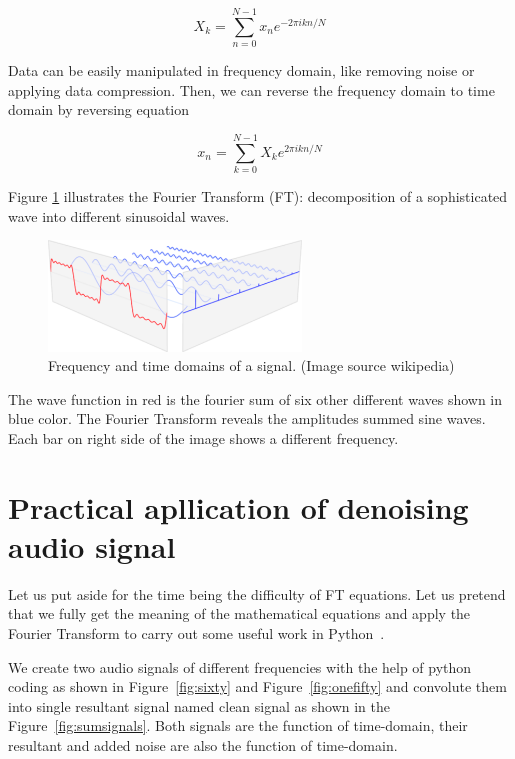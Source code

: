 \documentclass[a4paper, 12pt]{scrartcl}
\begin{document}
\begin{equation}
  X_k = \sum_{n=0}^{N-1} x_n e^{-2 \pi i k n / N}
\end{equation}

Data can be easily manipulated in frequency domain, like removing noise or applying data compression.
Then, we can reverse the frequency domain to time domain by reversing equation

\begin{equation}
  x_n = \sum_{k=0}^{N-1} X_k e^{2 \pi i k n / N}
\end{equation}

Figure \ref{fig:fourier} illustrates the Fourier Transform (FT): decomposition of a sophisticated wave into different sinusoidal waves.

\begin{figure}[H] 
  \centering
  \includegraphics[width=0.6\textwidth]{img/fourier-dimensions.png}
  \caption{Frequency and time domains of a signal. (Image source wikipedia)}
  \label{fig:fourier}
\end{figure}

The wave function in red is the fourier sum of six other different waves shown in blue color. The Fourier Transform reveals the amplitudes summed sine waves.
 Each bar on right side of the image shows a different frequency.  

\section{Practical apllication of denoising audio signal}
Let us put aside for the time being the difficulty of FT equations.
Let us pretend that we fully get the meaning of the mathematical equations and apply the Fourier Transform to carry out some useful work in Python~\cite{CleanUpNoise}.

We create two audio signals of different frequencies with the help of python coding as shown in Figure~\ref{fig:sixty} and Figure~\ref{fig:onefifty} 
and convolute them into single resultant signal named clean signal as shown in the Figure~\ref{fig:sumsignals}. 
Both signals are the function of time-domain, their resultant and added noise are also the function of time-domain.
\end{document}
